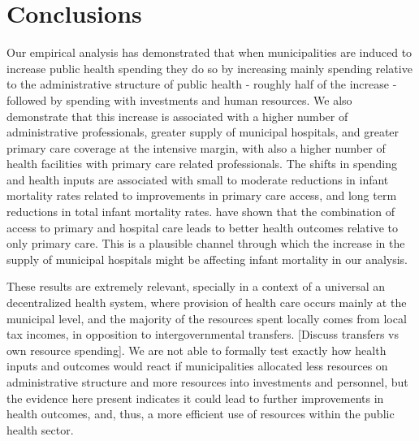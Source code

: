 \section{Conclusions}\label{sec:conclusion}

Our empirical analysis has demonstrated that when municipalities are induced to increase public health spending they do so by increasing mainly spending relative to the administrative structure of public health - roughly half of the increase -  followed by spending with investments and human resources. We also demonstrate that this increase is associated with a higher number of administrative professionals, greater supply of municipal hospitals, and greater primary care coverage at the intensive margin, with also a higher number of health facilities with primary care related professionals. The shifts in spending and health inputs are associated with small to moderate reductions in infant mortality rates related to improvements in primary care access, and long term reductions in total infant mortality rates. \cite{bhalotra2019can} have shown that the combination of access to primary and hospital care leads to better health outcomes relative to only primary care. This is a plausible channel through which the increase in the supply of municipal hospitals might be affecting infant mortality in our analysis.

These results are extremely relevant, specially in a context of a universal an decentralized health system, where provision of health care occurs mainly at the municipal level, and the majority of the resources spent locally comes from local tax incomes, in opposition to intergovernmental transfers. [Discuss transfers vs own resource spending]. We are not able to formally test exactly how health inputs and outcomes would react if municipalities allocated less resources on administrative structure and more resources into investments and personnel, but the evidence here present indicates it could lead to further improvements in health outcomes, and, thus, a more efficient use of resources within the public health sector. 

